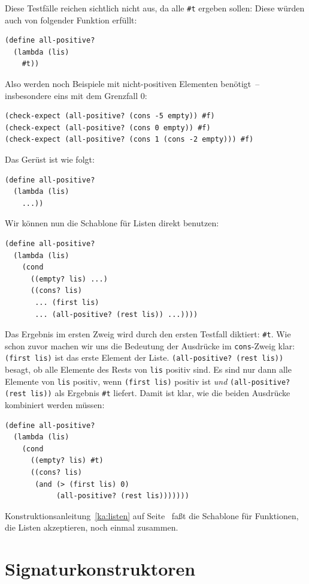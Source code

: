 Diese Testfälle reichen sichtlich nicht aus, da alle \verb|#t| ergeben
sollen: Diese würden auch von folgender Funktion erfüllt:
%
\begin{verbatim}
(define all-positive?
  (lambda (lis)
    #t))
\end{verbatim}
%
Also werden noch Beispiele mit nicht-positiven Elementen benötigt~--
insbesondere eins mit dem Grenzfall $0$:
\begin{verbatim}
(check-expect (all-positive? (cons -5 empty)) #f)
(check-expect (all-positive? (cons 0 empty)) #f)
(check-expect (all-positive? (cons 1 (cons -2 empty))) #f)
\end{verbatim}
%
Das Gerüst ist wie folgt:
%
\begin{verbatim}
(define all-positive?
  (lambda (lis)
    ...))
\end{verbatim}
%
Wir können nun die Schablone für Listen direkt benutzen:
%
\begin{verbatim}
(define all-positive?
  (lambda (lis)
    (cond
      ((empty? lis) ...)
      ((cons? lis)
       ... (first lis)
       ... (all-positive? (rest lis)) ...))))
\end{verbatim}
%
Das Ergebnis im ersten Zweig wird durch den ersten Testfall diktiert:
\verb|#t|.  Wie schon zuvor machen wir uns die Bedeutung der
Ausdrücke im \texttt{cons}-Zweig klar:
\texttt{(first lis)} ist das erste Element der Liste.
\texttt{(all-positive? (rest lis))} besagt, ob alle Elemente
des Rests von \texttt{lis} positiv sind.  Es sind nur dann alle
Elemente von \texttt{lis} positiv, wenn \texttt{(first lis)}
positiv ist \emph{und} \texttt{(all-positive? (rest lis))} als Ergebnis
\verb|#t| liefert.  Damit ist klar, wie die beiden Ausdrücke
kombiniert werden müssen:
%
\begin{verbatim}
(define all-positive?
  (lambda (lis)
    (cond
      ((empty? lis) #t)
      ((cons? lis)
       (and (> (first lis) 0)
            (all-positive? (rest lis)))))))
\end{verbatim}
%
Konstruktionsanleitung~\ref{ka:listen} auf Seite~\pageref{ka:listen}
faßt die Schablone für Funktionen, die Listen akzeptieren, noch einmal
zusammen.

\section{Signaturkonstruktoren}

